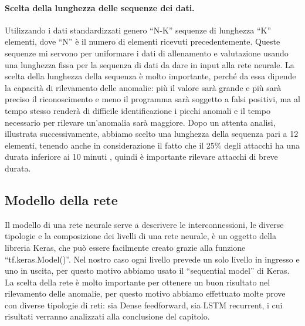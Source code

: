 
\paragraph{Scelta della lunghezza delle sequenze dei dati.} Utilizzando i dati standardizzati genero ``N-K'' sequenze di lunghezza ``K'' elementi, dove ``N'' è il numero di elementi ricevuti precedentemente. Queste sequenze mi servono per uniformare i dati di allenamento e valutazione usando una lunghezza fissa per la sequenza di dati da dare in input alla rete neurale.
La scelta della lunghezza della sequenza è molto importante, perché da essa dipende la capacità di rilevamento delle anomalie: più il valore sarà grande e più sarà preciso il riconoscimento e meno il programma sarà soggetto a falsi positivi, ma al tempo stesso renderà di difficile identificazione i picchi anomali e il tempo necessario per rilevare un'anomalia sarà maggiore.
Dopo un attenta analisi, illustrata successivamente, abbiamo scelto una lunghezza della sequenza pari a 12 elementi, tenendo anche in considerazione il fatto che il 25\% degli attacchi ha una durata inferiore ai 10 minuti \cite{imperva_ddos_report}, quindi è importante rilevare attacchi di breve durata.


\subsection{Modello della rete}


Il modello di una rete neurale serve a descrivere le interconnessioni, le diverse tipologie e la composizione dei livelli di una rete neurale, è un oggetto della libreria Keras, che può essere facilmente creato grazie alla funzione ``tf.keras.Model()''.
Nel nostro caso ogni livello prevede un solo livello in ingresso e uno in uscita, per questo motivo abbiamo usato il ``sequential model'' di Keras.
La scelta della rete è molto importante per ottenere un buon risultato nel rilevamento delle anomalie, per questo motivo abbiamo effettuato molte prove con diverse tipologie di reti: sia Dense feedforward, sia LSTM recurrent, i cui risultati verranno analizzati alla conclusione del capitolo.


